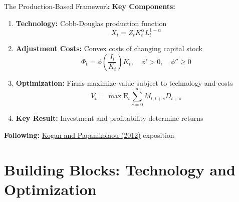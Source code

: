 \documentclass{beamer}
\begin{document}
\begin{frame}{The Production-Based Framework}
    \textbf{Key Components:}
    \begin{enumerate}
        \item \textbf{Technology:} Cobb-Douglas production function
        \begin{equation*}
            X_t = Z_t K_t^\alpha L_t^{1-\alpha}
        \end{equation*}
        
        \item \textbf{Adjustment Costs:} Convex costs of changing capital stock
        \begin{equation*}
            \Phi_t = \phi\left(\frac{I_t}{K_t}\right) K_t, \quad \phi' > 0, \quad \phi'' \geq 0
        \end{equation*}
        
        \item \textbf{Optimization:} Firms maximize value subject to technology and costs
        \begin{equation*}
            V_t = \max \mathrm{E}_t \sum_{s=0}^{\infty} M_{t,t+s} D_{t+s}
        \end{equation*}
        
        \item \textbf{Key Result:} Investment and profitability determine returns
    \end{enumerate}
    
    \vspace{0.2cm}
    \textbf{Following:} \textcolor{blue}{\href{https://doi.org/10.1146/annurev-financial-110311-101731}{Kogan and Papanikolaou (2012)}} exposition
\end{frame}

\section{Building Blocks: Technology and Optimization}
\end{document}
